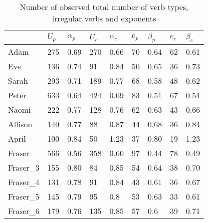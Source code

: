 \begin{table}[htb]
\centering
\caption{Number of observed total number of verb types, irregular verbs and exponents}
\begin{tabular}{lllllllll}
\toprule
 & $U_p$ & $\alpha_p$ & $U_c$ & $\alpha_c$ & $e_p$ & $\beta_p$ & $e_c$ & $\beta_c$ \\
\hline
Adam & 275 & 0.69 & 270 & 0.66 & 70 & 0.64 & 62 & 0.61 \\
Eve & 136 & 0.74 & 91 & 0.84 & 50 & 0.65 & 36 & 0.73 \\
Sarah & 293 & 0.71 & 189 & 0.77 & 68 & 0.58 & 48 & 0.62 \\
Peter & 633 & 0.64 & 424 & 0.69 & 83 & 0.51 & 67 & 0.54 \\
Naomi & 222 & 0.77 & 128 & 0.76 & 62 & 0.63 & 43 & 0.66 \\
Allison & 140 & 0.77 & 88 & 0.87 & 44 & 0.68 & 36 & 0.84 \\
April & 100 & 0.84 & 50 & 1.23 & 37 & 0.80 & 19 & 1.23 \\
Fraser & 566 & 0.56 & 358 & 0.60 & 97 & 0.44 & 78 & 0.49 \\
\bottomrule
\bottomrule
Fraser_3 & 155 & 0.80 & 84 & 0.85 & 54 & 0.64 & 38 & 0.70\\
Fraser_4 & 131 & 0.78 & 91 & 0.84 & 43 & 0.61 & 36 & 0.67\\
Fraser_5 & 145 & 0.79  & 95  & 0.8  & 53  & 0.63  & 33  &0.61\\
Fraser_6 & 179 & 0.76 & 135 & 0.85 & 57 & 0.6 & 39 & 0.71\\
\bottomrule
\end{tabular}
\end{table}


